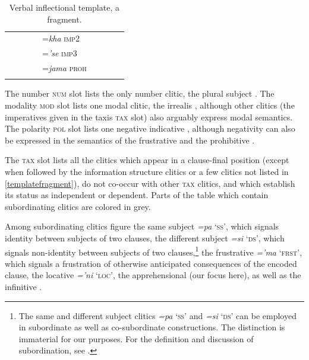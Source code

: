 \documentclass[output=paper,colorlinks,citecolor=brown]{langscibook}
\begin{document}
\begin{table}[t]
\begin{tabularx}{\textwidth}{l Q Q Q Q Q Q Q l}
\tablevspace
&        &      &       &=\textit{kha}\newline
                         \textsc{imp2} & &        & \\
\tablevspace
&        &      &       &=\textit{'se}\newline
                         \textsc{imp3}& &        & \\
\tablevspace
&        &      &       &=\textit{jama}\newline
                         \textsc{proh}& &        & \\
\lspbottomrule
\end{tabularx}
\caption{Verbal inflectional template, a fragment.}
\label{templatefragment}
\end{table}

The number \textsc{num} slot lists the only number clitic, the plural subject . The modality \textsc{mod} slot lists one modal clitic, the irrealis , although other clitics (\eg the imperatives given in the taxis \textsc{tax} slot) also arguably express modal semantics. The polarity \textsc{pol} slot lists one negative indicative , although negativity can also be expressed in the semantics of the frustrative  and the prohibitive .

The \textsc{tax} slot lists all the clitics which appear in a clause-final position (except when followed by the information structure clitics or a few clitics not listed in \autoref{templatefragment}), do not co-occur with other \textsc{tax} clitics, and which establish its status as independent or dependent. {Parts of the table which contain subordinating clitics are colored in grey.}

Among subordinating clitics figure the same subject \emph{=pa} `\textsc{ss}', which signals identity between subjects of two clauses, the different subject \emph{=si} `\textsc{ds}', which signals non-identity between subjects of two clauses,\footnote{The same and different subject clitics \emph{=pa} `\textsc{ss}' and \emph{=si} `\textsc{ds}' can be employed in subordinate as well as co-subordinate constructions. The distinction is immaterial for our purposes. For the definition and discussion of  subordination, see \citet{fischer2007clause}.} the frustrative \emph{='ma} `\textsc{frst}',  which signals a frustration of otherwise anticipated consequences of the encoded clause, the locative \emph{='ni} `\textsc{loc}', the apprehensional  (our focus here), as well as the infinitive .
\end{document}
